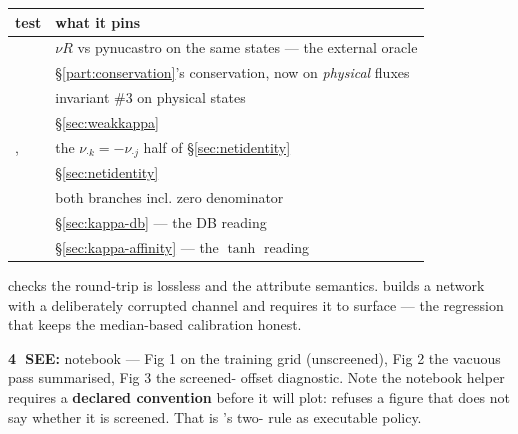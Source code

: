 \begin{center}
\begin{tabularx}{\textwidth}{@{}L{6.8cm} Y@{}}
\toprule
\textbf{test} & \textbf{what it pins} \\
\midrule
{} &
  $\nu R$ vs pynucastro on the same states --- the external oracle \\
 &
  \S\ref{part:conservation}'s conservation, now on \emph{physical} fluxes \\
 & invariant \#3 on physical states \\
 &
  \S\ref{sec:weakkappa} \\
,
 &
  the $\nu_{\cdot k} = -\nu_{\cdot j}$ half of \S\ref{sec:netidentity} \\
 & \S\ref{sec:netidentity} \\
 & both branches incl. zero denominator \\
 &
  \S\ref{sec:kappa-db} --- the DB reading \\
 &
  \S\ref{sec:kappa-affinity} --- the $\tanh$ reading \\
\bottomrule
\end{tabularx}
\end{center}

 checks the round-trip is lossless and the
 attribute semantics. 
builds a network with a deliberately corrupted channel and requires it to
surface --- the regression that keeps the median-based calibration honest.

\begin{repopointer}
\textbf{\textcircled{4} SEE:} notebook  --- Fig 1
\kap{} on the training grid (unscreened), Fig 2 the vacuous pass summarised,
Fig 3 the screened-\kap{} offset diagnostic. Note the notebook helper requires a
\textbf{declared \kap{} convention} before it will plot: 
refuses a \kap{} figure that does not say whether it is screened. That is
's two-\kap{} rule as executable policy.
\end{repopointer}


